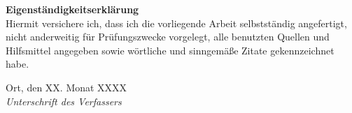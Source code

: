 \noindent
{\Large \textbf{Eigenständigkeitserklärung}}\\ 

\vspace*{5mm}
Hiermit versichere ich, dass ich die vorliegende Arbeit selbstständig angefertigt, nicht anderweitig für Prüfungszwecke vorgelegt, alle benutzten Quellen und Hilfsmittel angegeben sowie wörtliche und sinngemäße Zitate gekennzeichnet habe.
\vspace{2cm}

\noindent
Ort, den XX. Monat XXXX
\hspace*{2cm}%
\dotfill\\
\hspace*{8.5cm}%
\textit{Unterschrift des Verfassers}